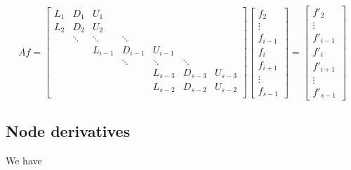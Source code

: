 \documentclass[11pt]{article}
\begin{document}
\[ Af = \left[
\begin{array}{ccccccccc}
L_{1} & D_{1}    & U_{1}     &           &           &           &         \\
L_{2} & D_{2}    & U_{2}     &           &           &           &         \\
      & \ddots   & \ddots    & \ddots    &           &           &         \\
      &          & L_{i-1}   & D_{i-1}   & U_{i-1}   &           &         \\
      &          &           & \ddots    & \ddots    & \ddots    &         \\
      &          &           &           & L_{s-3}   & D_{s-3}   & U_{s-3} \\
      &          &           &           & L_{s-2}   & D_{s-2}   & U_{s-2} \\
\end{array} \right]
\left[ \begin{array}{c}
f_{2} \\ \vdots \\ f_{i-1} \\ f_{i} \\ f_{i+1} \\ \vdots \\ f_{s-1}
\end{array} \right]
=
\left[ \begin{array}{c}
f'_{2} \\ \vdots \\ f'_{i-1} \\ f'_{i} \\ f'_{i+1} \\ \vdots \\ f'_{s-1}
\end{array} \right]
\]

\subsection{Node derivatives}
We have
\end{document}
